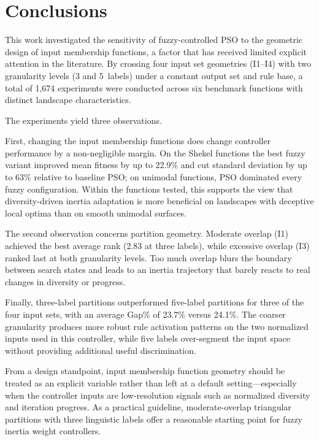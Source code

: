 \documentclass[conference]{IEEEtran}
\begin{document}
\section{Conclusions}
\label{sec:conclusions}

This work investigated the sensitivity of fuzzy-controlled PSO to the geometric design of input membership functions, a factor that has received limited explicit attention in the literature. By crossing four input set geometries (I1--I4) with two granularity levels (3 and 5~labels) under a constant output set and rule base, a total of 1,674 experiments were conducted across six benchmark functions with distinct landscape characteristics.

The experiments yield three observations.

First, changing the input membership functions does change controller performance by a non-negligible margin. On the Shekel functions the best fuzzy variant improved mean fitness by up to 22.9\% and cut standard deviation by up to 63\% relative to baseline PSO; on unimodal functions, PSO dominated every fuzzy configuration. Within the functions tested, this supports the view that diversity-driven inertia adaptation is more beneficial on landscapes with deceptive local optima than on smooth unimodal surfaces.

The second observation concerns partition geometry. Moderate overlap (I1) achieved the best average rank (2.83 at three labels), while excessive overlap (I3) ranked last at both granularity levels. Too much overlap blurs the boundary between search states and leads to an inertia trajectory that barely reacts to real changes in diversity or progress.

Finally, three-label partitions outperformed five-label partitions for three of the four input sets, with an average Gap\% of 23.7\% versus 24.1\%. The coarser granularity produces more robust rule activation patterns on the two normalized inputs used in this controller, while five labels over-segment the input space without providing additional useful discrimination.

From a design standpoint, input membership function geometry should be treated as an explicit variable rather than left at a default setting---especially when the controller inputs are low-resolution signals such as normalized diversity and iteration progress. As a practical guideline, moderate-overlap triangular partitions with three linguistic labels offer a reasonable starting point for fuzzy inertia weight controllers.
\end{document}
